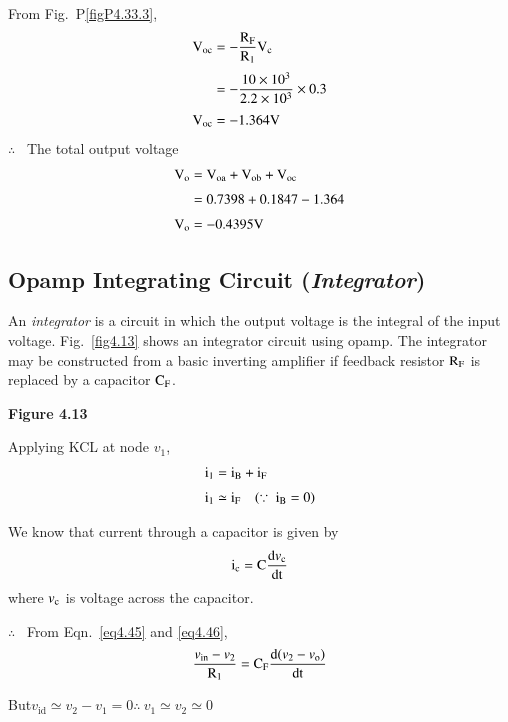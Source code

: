 \begin{solution}
From Fig.~P\ref{figP4.33.3}, 
\begin{align*}
\textrm{V}_{\textrm{o}\textrm{c}} &= -\frac{\textrm{R}_{\textrm{F}}}{\textrm{R}_{1}}\textrm{V}_{\textrm{c}}\\[3pt]
&= -\frac{10\times 10^{3}}{2.2\times 10^{3}}\times 0.3\\[3pt]
\textrm{V}_{\textrm{o}\textrm{c}} &=-1.364\textrm{V}
\end{align*}
$\therefore$~ The total output voltage 
\begin{align*}
\textrm{V}_{\textrm{o}} &= \textrm{V}_{\textrm{o}\textrm{a}}+\textrm{V}_{\textrm{o}\textrm{b}}+\textrm{V}_{\textrm{o}\textrm{c}}\\[3pt]
          &= 0.7398+0.1847-1.364\\[3pt]
\textrm{V}_{\textrm{o}} &= -0.4395\textrm{V}
\end{align*}
\end{solution}

\subsection{Opamp Integrating Circuit ({\em Integrator})}\label{sec4.6.5}

An {\em integrator} is a circuit in which the output voltage is the integral of the input voltage. Fig.~\ref{fig4.13} shows an integrator circuit using opamp. The integrator may be constructed from a basic inverting amplifier if feedback resistor $\textrm{R}_{\textrm{F}}$ is replaced by a capacitor $\textrm{C}_{\textrm{F}}$.
\begin{center}
{\bf Figure 4.13}
\end{center}

Applying KCL at node $v_{1}$,
\begin{align}
\rmi_{1} &= \rmi_{\rmB}+\rmi_{\rmF}\label{eq4.44}\\[3pt]
\rmi_{1} &\simeq \rmi_{\rmF}\quad (\because \ \rmi_{\rmB}=0)\label{eq4.45}
\end{align}

We know that current through a capacitor is given by
\begin{equation}
\textrm{i}_{\textrm{c}} = \textrm{C}\frac{\textrm{d} v_{\textrm{c}}}{\operatorname{dt}}\label{eq4.46}
\end{equation}
where $v_{\textrm{c}}$ is voltage across the capacitor.

$\therefore$~ From Eqn.~\eqref{eq4.45} and \eqref{eq4.46},
\begin{equation}
\frac{v_{\text{in}}-v_{2}}{\textrm{R}_{1}}=\textrm{C}_{\textrm{F}}\dfrac{\textrm{d} (v_{2}-v_{\textrm{o}})}{\operatorname{dt}}\label{eq4.47}
\end{equation}

But\quad $v_{\text{id}}\simeq v_{2}-v_{1}=0$\quad $\therefore~ v_{1}\simeq v_{2}\simeq 0$

